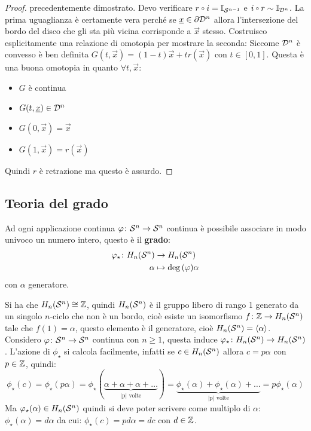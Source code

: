 \begin{proof}
  precedentemente dimostrato.
  Devo verificare $ r \circ i = \Id{\Sph{n-1}} $ e $ i \circ r \sim \Id{\Disk{n}} $.
  La prima uguaglianza è certamente vera perché se $ \underline{x} \in \partial \mathcal{D}^{n} $
  allora l'intersezione del bordo del disco che gli sta più vicina corrisponde a
  $ \vec{x} $ stesso.
  Costruisco esplicitamente una relazione di omotopia per mostrare la seconda:
  Siccome $ \mathcal{D}^{n} $ è convesso è ben definita $ G(t, \vec{x}) = (1-t)\vec{x}
  + t r(\vec{x}) $ con $ t \in [0,1] $. Questa è una buona omotopia in quanto $ \forall t, \vec{x} $:
  \begin{itemize}
  \item $ G $ è continua
  \item $ G(t, \underline{x}) \in \mathcal{D}^{n} $
  \item $ G(0, \vec{x}) = \vec{x} $
  \item $ G(1, \vec{x}) = r(\vec{x}) $
  \end{itemize}
  Quindi $ r $ è retrazione ma questo è assurdo.
\end{proof}


\subsection{Teoria del grado}
\begin{definition}
  Ad ogni applicazione continua $ \varphi \colon \mathcal{S}^{n} \to \mathcal{S}^{n} $ continua è possibile
  associare in modo univoco un numero intero, questo è il \textbf{grado}:
  \begin{align*}
    \varphi_\star \colon H_n(\mathcal{S}^{n}) & \to H_n(\mathcal{S}^{n}) \\
    \alpha & \mapsto  \deg{(\varphi)} \alpha
  \end{align*}
  con $ \alpha $ generatore.
\end{definition}

Si ha che $ H_n(\mathcal{S}^{n}) \cong \mathbb{Z} $, quindi $ H_n(\mathcal{S}^{n}) $ è il gruppo libero di
rango 1 generato da un singolo $ n $-ciclo che non è un bordo, cioè esiste un
isomorfismo $ f \colon \mathbb{Z} \to H_n(\mathcal{S}^{n}) $ tale che $ f(1) = \alpha $, questo elemento è
il generatore, cioè $ H_n(\mathcal{S}^{n}) = \langle\alpha\rangle $. Considero
$ \varphi \colon \mathcal{S}^{n} \to \mathcal{S}^{n} $ continua con $ n \geq 1 $, questa induce
$ \varphi_\star \colon H_n(\mathcal{S}^{n}) \to H_n(\mathcal{S}^{n}) $.
L'azione di $ \phi_\star $ si calcola facilmente, infatti se $ c \in H_n(\mathcal{S}^{n}) $
allora $ c = p \alpha $ con $ p \in \mathbb{Z} $, quindi:
\[
  \phi_\star (c) = \phi_\star (p \alpha) = \phi_\star (\underbrace{\alpha + \alpha + \alpha + \dots}_{\text{|p| volte}}) =
  \underbrace{\phi_\star (\alpha) + \phi_\star (\alpha) + \dots}_{\text{|p| volte}} = p \phi_\star(\alpha)
\]
Ma $ \varphi_\star(\alpha) \in H_n(\mathcal{S}^{n}) $ quindi si deve poter scrivere come multiplo di $ \alpha $:
$ \phi_\star (\alpha) = d \alpha $ da cui: $ \phi_\star (c) = p d \alpha = d c $ con $ d \in \mathbb{Z} $.

